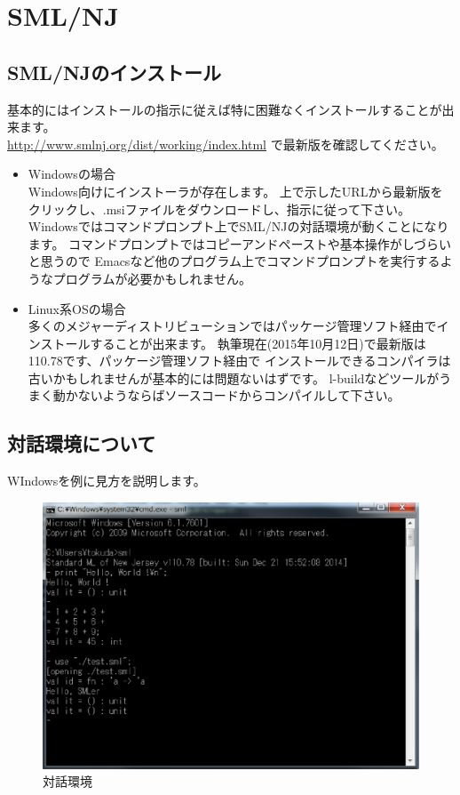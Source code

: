 \documentclass[11pt,a4paper]{article}
\begin{document}
\section{SML/NJ}
\subsection{SML/NJのインストール}
基本的にはインストールの指示に従えば特に困難なくインストールすることが出来ます。\\
\url{http://www.smlnj.org/dist/working/index.html} で最新版を確認してください。
\begin{itemize}
\item Windowsの場合\\
  Windows向けにインストーラが存在します。
  上で示したURLから最新版をクリックし、.msiファイルをダウンロードし、指示に従って下さい。\\
  Windowsではコマンドプロンプト上でSML/NJの対話環境が動くことになります。
  コマンドプロンプトではコピーアンドペーストや基本操作がしづらいと思うので
  Emacsなど他のプログラム上でコマンドプロンプトを実行するようなプログラムが必要かもしれません。
\item Linux系OSの場合\\
  多くのメジャーディストリビューションではパッケージ管理ソフト経由でインストールすることが出来ます。
  執筆現在(2015年10月12日)で最新版は110.78です、パッケージ管理ソフト経由で
  インストールできるコンパイラは古いかもしれませんが基本的には問題ないはずです。
  l-buildなどツールがうまく動かないようならばソースコードからコンパイルして下さい。
\end{itemize}
\subsection{対話環境について}
WIndowsを例に見方を説明します。

\begin{figure}[htbp]
  \centering
  \includegraphics[scale=0.8]{./interactive.eps}
  \caption{対話環境}
  \label{fig:hello}
\end{figure}
\end{document}
